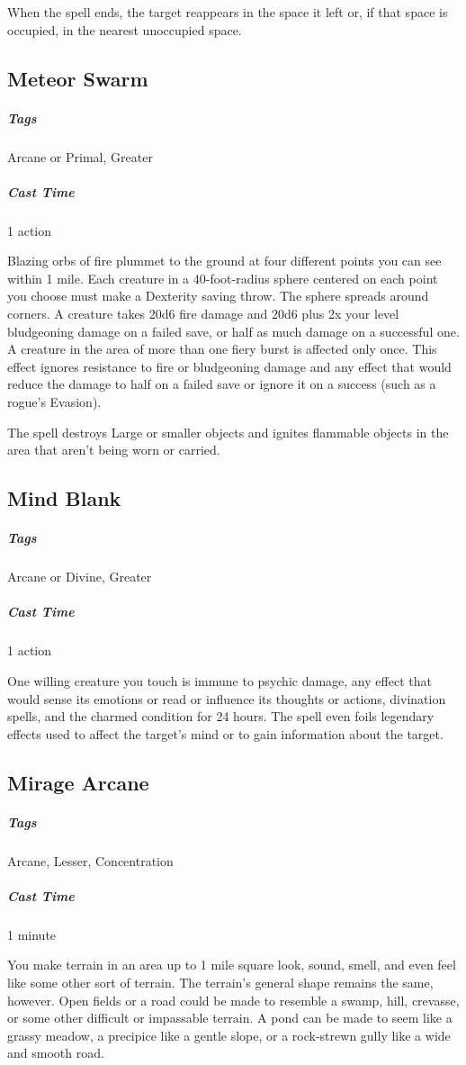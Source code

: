 When the spell ends, the target reappears in the space it left or, if that space is occupied, in the nearest unoccupied space.

\subsection{Meteor Swarm}\label{spell:meteor-swarm}
\subparagraph*{Tags} Arcane or Primal, Greater
\subparagraph*{Cast Time} 1 action

Blazing orbs of fire plummet to the ground at four different points you can see within 1 mile. Each creature in a 40-foot-radius sphere centered on each point you choose must make a Dexterity saving throw. The sphere spreads around corners. A creature takes 20d6 fire damage and 20d6 plus 2x your level bludgeoning damage  on a failed save, or half as much damage on a successful one. A creature in the area of more than one fiery burst is affected only once. This effect ignores resistance to fire or bludgeoning damage and any effect that would reduce the damage to half on a failed save or ignore it on a success (such as a rogue's Evasion).

The spell destroys Large or smaller objects and ignites flammable objects in the area that aren't being worn or carried.

\subsection{Mind Blank}\label{spell:mind-blank}
\subparagraph*{Tags} Arcane or Divine, Greater
\subparagraph*{Cast Time} 1 action

One willing creature you touch is immune to psychic damage, any effect that would sense its emotions or read or influence its thoughts or actions, divination spells, and the charmed condition for 24 hours. The spell even foils legendary effects used to affect the target's mind or to gain information about the target.

\subsection{Mirage Arcane}\label{spell:mirage-arcane}
\subparagraph*{Tags} Arcane, Lesser, Concentration
\subparagraph*{Cast Time} 1 minute

You make terrain in an area up to 1 mile square look, sound, smell, and even feel like some other sort of terrain. The terrain's general shape remains the same, however. Open fields or a road could be made to resemble a swamp, hill, crevasse, or some other difficult or impassable terrain. A pond can be made to seem like a grassy meadow, a precipice like a gentle slope, or a rock-strewn gully like a wide and smooth road.

